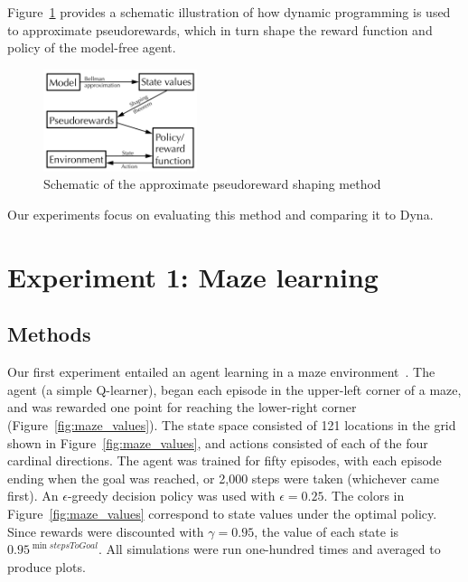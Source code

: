 \documentclass[letterpaper]{article}
\begin{document}
Figure~\ref{fig:approxPR_schematic} provides a schematic illustration of how dynamic programming is used to approximate pseudorewards, which in turn shape the reward function and policy of the model-free agent.

\begin{figure}[ht]
\centering
\includegraphics[width=0.4\textwidth]{approxPR_schematic}
\caption{Schematic of the approximate pseudoreward shaping method}
\label{fig:approxPR_schematic}
\end{figure}

Our experiments focus on evaluating this method and comparing it to Dyna.

\section{Experiment 1: Maze learning}

\subsection{Methods}

Our first experiment entailed an agent learning in a maze environment~\cite{sutton1991dyna, sutton1991planning, peng1993efficient, sutton1998reinforcement, wiering2012reinforcement}. The agent (a simple Q-learner), began each episode in the upper-left corner of a maze, and was rewarded one point for reaching the lower-right corner (Figure~\ref{fig:maze_values}). The state space consisted of 121 locations in the grid shown in Figure~\ref{fig:maze_values}, and actions consisted of each of the four cardinal directions. The agent was trained for fifty episodes, with each episode ending when the goal was reached, or 2,000 steps were taken (whichever came first). An $\epsilon$-greedy decision policy was used with $\epsilon = 0.25$. The colors in Figure~\ref{fig:maze_values} correspond to state values under the optimal policy. Since rewards were discounted with $\gamma = 0.95$, the value of each state is $0.95^{\min{stepsToGoal}}$. All simulations were run one-hundred times and averaged to produce plots.
\end{document}
